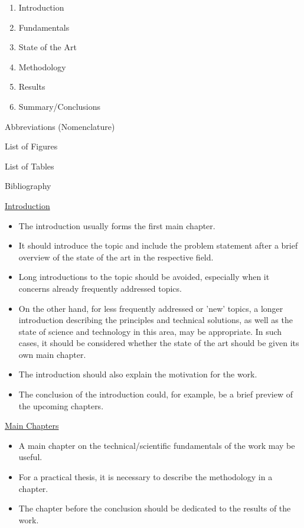 \documentclass[a4paper, fleqn, headsepline, footsepline, 12pt, parskip=half]{scrartcl}
\begin{document}
\begin{enumerate}
    \item Introduction
    \item Fundamentals
    \item State of the Art
    \item Methodology
    \item Results
    \item Summary/Conclusions
\end{enumerate}
\hspace{5mm}
Abbreviations (Nomenclature)

\vspace{1mm}
\hspace{5mm}
List of Figures

\vspace{1mm}
\hspace{5mm}
List of Tables

\vspace{1mm}
\hspace{5mm}
Bibliography

\vspace{5mm}
\underline{Introduction}

\begin{itemize}
    \item The introduction usually forms the first main chapter.
    \item It should introduce the topic and include the problem statement after a brief overview of the state of the art in the respective field.
    \item Long introductions to the topic should be avoided, especially when it concerns already frequently addressed topics.
    \item On the other hand, for less frequently addressed or 'new' topics, a longer introduction describing the principles and technical solutions, as well as the state of science and technology in this area, may be appropriate. In such cases, it should be considered whether the state of the art should be given its own main chapter.
    \item The introduction should also explain the motivation for the work.
    \item The conclusion of the introduction could, for example, be a brief preview of the upcoming chapters.
\end{itemize}

\underline{Main Chapters}

\begin{itemize}
    \item A main chapter on the technical/scientific fundamentals of the work may be useful.
    \item For a practical thesis, it is necessary to describe the methodology in a chapter.
    \item The chapter before the conclusion should be dedicated to the results of the work.
\end{itemize}
\end{document}

